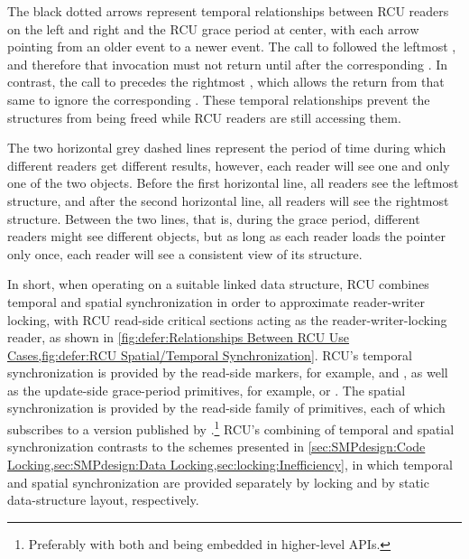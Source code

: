 The black dotted arrows represent temporal relationships between RCU readers
on the left and right and the RCU grace period at center, with each
arrow pointing from an older event to a newer event.
The call to  followed the leftmost ,
and therefore that  invocation must not return
until after the corresponding .
In contrast, the call to  precedes the
rightmost , which allows the return from that same
 to ignore the corresponding .
These temporal relationships prevent the  structures from
being freed while RCU readers are still accessing them.

The two horizontal grey dashed lines represent the period of time during
which different readers get different results, however, each reader
will see one and only one of the two objects.
Before the first horizontal line, all readers see the leftmost
 structure, and after the second horizontal line, all
readers will see the rightmost structure.
Between the two lines, that is, during the grace period, different
readers might see different objects, but as long as each reader
loads the  pointer only once, each reader will see
a consistent view of its  structure.

In short, when operating on a suitable linked data structure, RCU
combines temporal and spatial synchronization in order to approximate
reader-writer locking, with RCU read-side critical sections acting as
the reader-writer-locking reader, as shown in
\cref{fig:defer:Relationships Between RCU Use Cases,fig:defer:RCU Spatial/Temporal Synchronization}.
RCU's temporal synchronization is provided by the read-side markers,
for example,  and , as well as
the update-side grace-period primitives, for example, 
or .
The spatial synchronization is provided by the read-side
 family of primitives, each of which subscribes
to a version published by .\footnote{
	Preferably with both  and
	 being embedded in higher-level APIs.}
RCU's combining of temporal and spatial synchronization contrasts to
the schemes presented in
\cref{sec:SMPdesign:Code Locking,sec:SMPdesign:Data Locking,sec:locking:Inefficiency},
in which temporal and spatial synchronization are provided separately by
locking and by static data-structure layout, respectively.

